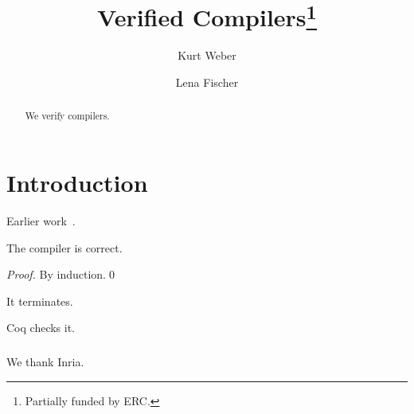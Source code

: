 \documentclass[runningheads]{llncs}
\begin{document}
\title{Verified Compilers\thanks{Partially funded by ERC.}}
\author{Kurt Weber \and
Lena Fischer}
\maketitle
\begin{abstract}
We verify compilers.
\end{abstract}
\section{Introduction}
Earlier work~\cite{knuth}.
\begin{theorem}
The compiler is correct.
\end{theorem}
\begin{proof}
By induction.\qed
\end{proof}
\begin{claim}
It terminates.
\end{claim}
\begin{remark}
Coq checks it.
\end{remark}
\begin{credits}
\subsubsection{\ackname} We thank Inria.
\end{credits}


\end{document}
